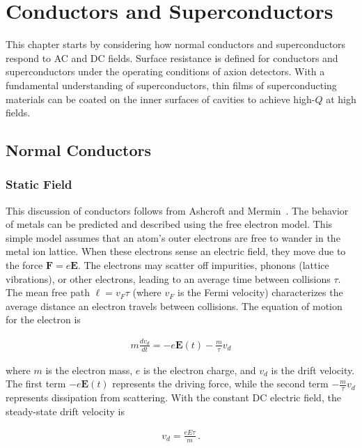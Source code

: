 \chapter{Conductors and Superconductors}\label{ch:MaterialScience}

This chapter starts by considering how normal conductors and superconductors respond to AC and DC fields. Surface resistance is defined for conductors and superconductors under the operating conditions of axion detectors. With a fundamental understanding of superconductors, thin films of superconducting materials can be coated on the inner surfaces of cavities to achieve high-$Q$ at high fields. 

\section{Normal Conductors}
    
    \subsection{Static Field}
    
    This discussion of conductors follows from Ashcroft and Mermin~\cite{ashcroftSolidStatePhysics1976}. The behavior of metals can be predicted and described using the free electron model. This simple model assumes that an atom's outer electrons are free to wander in the metal ion lattice. When these electrons sense an electric field, they move due to the force $\mathbf{F}=e\mathbf{E}$. The electrons may scatter off impurities, phonons (lattice vibrations), or other electrons, leading to an average time between collisions $\tau$. The mean free path $\ell = v_F\tau$ (where $v_F$ is the Fermi velocity) characterizes the average distance an electron travels between collisions. The equation of motion for the electron is
    
    \begin{align}
        m\frac{dv_d}{dt} = -e\mathbf{E}(t) - \frac{m}{\tau}v_d\label{eq:EOMcondcutor}
    \end{align}   

    \noindent where $m$ is the electron mass, $e$ is the electron charge, and $v_d$ is the drift velocity. The first term $-e\mathbf{E}(t)$ represents the driving force, while the second term $- \frac{m}{\tau}v_d$ represents dissipation from scattering. With the constant DC electric field, the steady-state drift velocity is
    
    \begin{align}
        v_d = \frac{eE\tau}{m}\,. \label{eq:driftvelocity}
    \end{align}
    
